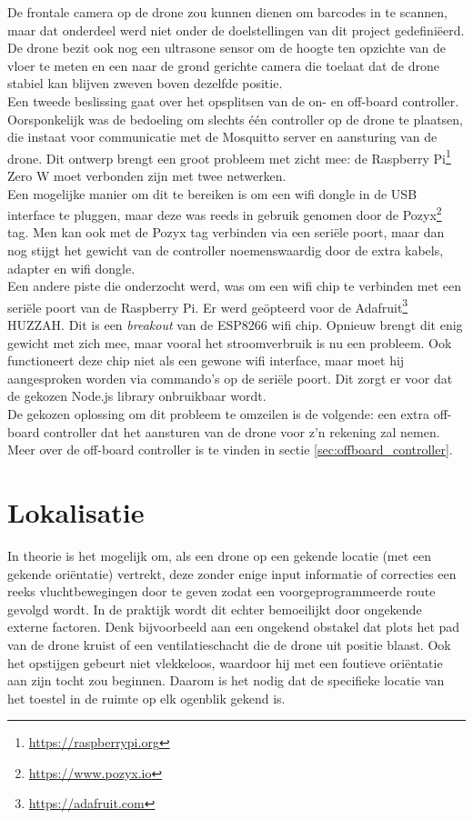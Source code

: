 De frontale camera op de drone zou kunnen dienen om barcodes in te scannen, maar dat onderdeel werd niet onder de doelstellingen van dit project gedefini\"eerd. De drone bezit ook nog een ultrasone sensor om de hoogte ten opzichte van de vloer te meten en een naar de grond gerichte camera die toelaat dat de drone stabiel kan blijven zweven boven dezelfde positie.\\

Een tweede beslissing gaat over het opsplitsen van de on- en off-board controller.
Oorsponkelijk was de bedoeling om slechts één controller op de drone te plaatsen, die instaat voor communicatie met de Mosquitto server en aansturing van de drone.
Dit ontwerp brengt een groot probleem met zicht mee: de Raspberry Pi\footnote{\url{https://raspberrypi.org}} Zero W moet verbonden zijn met twee netwerken.\\
Een mogelijke manier om dit te bereiken is om een wifi dongle in de USB interface te pluggen, maar deze was reeds in gebruik genomen door de Pozyx\footnote{\url{https://www.pozyx.io}} tag.
Men kan ook met de Pozyx tag verbinden via een seriële poort, maar dan nog stijgt het gewicht van de controller noemenswaardig door de extra kabels, adapter en wifi dongle.\\
Een andere piste die onderzocht werd, was om een wifi chip te verbinden met een seriële poort van de Raspberry Pi.
Er werd geöpteerd voor de Adafruit\footnote{\url{https://adafruit.com}} HUZZAH.
Dit is een \textit{breakout} van de ESP8266 wifi chip.
Opnieuw brengt dit enig gewicht met zich mee, maar vooral het stroomverbruik is nu een probleem.
Ook functioneert deze chip niet als een gewone wifi interface, maar moet hij aangesproken worden via commando's op de seriële poort.
Dit zorgt er voor dat de gekozen Node.js library onbruikbaar wordt.\\
De gekozen oplossing om dit probleem te omzeilen is de volgende: een extra off-board controller dat het aansturen van de drone voor z'n rekening zal nemen.
Meer over de off-board controller is te vinden in sectie \ref{sec:offboard_controller}.

\section{Lokalisatie} \label{sec:localization}
In theorie is het mogelijk om, als een drone op een gekende locatie (met een gekende ori\"entatie) vertrekt, deze zonder enige input informatie of correcties een reeks vluchtbewegingen door te geven zodat een voorgeprogrammeerde route gevolgd wordt.
In de praktijk wordt dit echter bemoeilijkt door ongekende externe factoren. Denk bijvoorbeeld aan een ongekend obstakel dat plots het pad van de drone kruist of een ventilatieschacht die de drone uit positie blaast.
Ook het opstijgen gebeurt niet vlekkeloos, waardoor hij met een foutieve ori\"entatie aan zijn tocht zou beginnen.
Daarom is het nodig dat de specifieke locatie van het toestel in de ruimte op elk ogenblik gekend is.\\

